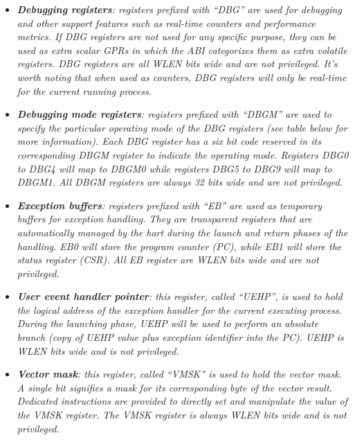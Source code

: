 \documentclass{article}
\begin{document}
                \begin{itemize}

                    \item \textit{\textbf{Debugging registers}: registers prefixed with ``DBG'' are used for debugging and other support features such as real-time counters and performance metrics. If DBG registers are not used for any specific purpose, they can be used as extra scalar GPRs in which the ABI categorizes them as extra volatile registers. DBG registers are all WLEN bits wide and are not privileged. It's worth noting that when used as counters, DBG registers will only be real-time for the current running process.}

                    \item \textit{\textbf{Debugging mode registers}: registers prefixed with ``DBGM'' are used to specify the particular operating mode of the DBG registers (see table below for more information). Each DBG register has a six bit code reserved in its corresponding DBGM register to indicate the operating mode. Registers DBG0 to DBG4 will map to DBGM0 while registers DBG5 to DBG9 will map to DBGM1. All DBGM registers are always 32 bits wide and are not privileged.}

                    \item \textit{\textbf{Exception buffers}: registers prefixed with ``EB'' are used as temporary buffers for exception handling. They are transparent registers that are automatically managed by the hart during the launch and return phases of the handling. EB0 will store the program counter (PC), while EB1 will store the status register (CSR). All EB register are WLEN bits wide and are not privileged.}

                    \item \textit{\textbf{User event handler pointer}: this register, called ``UEHP'', is used to hold the logical address of the exception handler for the current executing process. During the launching phase, UEHP will be used to perform an absolute branch (copy of UEHP value plus exception identifier into the PC). UEHP is WLEN bits wide and is not privileged.}

                    \item \textit{\textbf{Vector mask}: this register, called ``VMSK'' is used to hold the vector mask. A single bit signifies a mask for its corresponding byte of the vector result. Dedicated instructions are provided to directly set and manipulate the value of the VMSK register. The VMSK register is always WLEN bits wide and is not privileged.}


\end{itemize}
\end{document}

